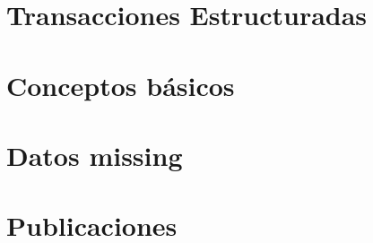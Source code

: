 




\section{Transacciones Estructuradas}
\label{sec:clasificacion:transacciones-tipo-ii}





\section{Conceptos básicos}
\label{sec:clasificacion:conceptos-basicos}





\section{\Catalogo}
\label{sec:clasificacion:catalogo}





\section{\CC}
\label{sec:clasificacion:catalogo-completo}





\section{Datos missing}
\label{sec:clasificacion:datos-missing}





\section{Publicaciones}
\label{sec:clasificacion:publicaciones}

